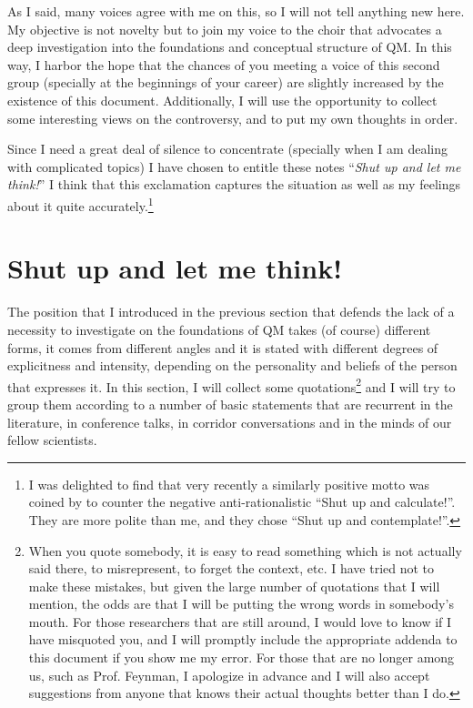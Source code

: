 \documentclass[a4paper,12pt]{article}
\begin{document}
As I said, many voices agree with me on this, so I will not tell anything new
here. My objective is not novelty but to join my voice to the choir that
advocates a deep investigation into the foundations and conceptual structure
of QM. In this way, I harbor the hope that the chances of you meeting a voice
of this second group (specially at the beginnings of your career) are slightly
increased by the existence of this document. Additionally, I will use the
opportunity to collect some interesting views on the controversy, and to put
my own thoughts in order.

Since I need a great deal of silence to concentrate (specially when I am
dealing with complicated topics) I have chosen to entitle these notes
``\emph{Shut up and let me think!}'' I think that this exclamation captures
the situation as well as my feelings about it quite
accurately.\footnote{\label{foot:contemplate} I was delighted to find that
very recently a similarly positive motto was coined by \cite{Hardy2010} to
counter the negative anti-rationalistic ``Shut up and calculate!''. They are
more polite than me, and they chose ``Shut up and contemplate!''.}


\section{Shut up and let me think!}
\label{sec:shut_up}

The position that I introduced in the previous section that defends the lack
of a necessity to investigate on the foundations of QM takes (of course)
different forms, it comes from different angles and it is stated with
different degrees of explicitness and intensity, depending on the personality
and beliefs of the person that expresses it. In this section, I will collect
some quotations\footnote{\label{foot:quotations} When you quote somebody, it
is easy to read something which is not actually said there, to misrepresent,
to forget the context, etc. I have tried not to make these mistakes, but given
the large number of quotations that I will mention, the odds are that I will
be putting the wrong words in somebody's mouth. For those researchers that are
still around, I would love to know if I have misquoted you, and I will
promptly include the appropriate addenda to this document if you show me my
error. For those that are no longer among us, such as Prof. Feynman, I
apologize in advance and I will also accept suggestions from anyone that knows
their actual thoughts better than I do.} and I will try to group them
according to a number of basic statements that are recurrent in the
literature, in conference talks, in corridor conversations and in the minds of
our fellow scientists.
\end{document}
